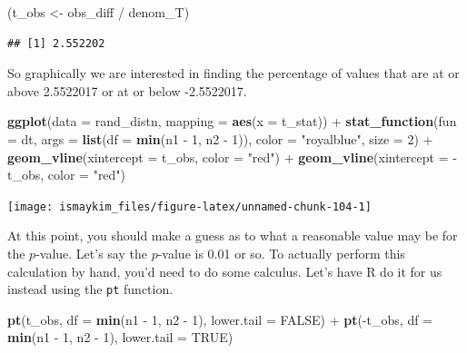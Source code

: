 \documentclass[]{tufte-book}
\newenvironment{Shaded}{\begin{snugshade}}{\end{snugshade}}
\newcommand{\KeywordTok}[1]{\textcolor[rgb]{0.13,0.29,0.53}{\textbf{{#1}}}}
\newcommand{\DataTypeTok}[1]{\textcolor[rgb]{0.13,0.29,0.53}{{#1}}}
\newcommand{\DecValTok}[1]{\textcolor[rgb]{0.00,0.00,0.81}{{#1}}}
\newcommand{\StringTok}[1]{\textcolor[rgb]{0.31,0.60,0.02}{{#1}}}
\newcommand{\OtherTok}[1]{\textcolor[rgb]{0.56,0.35,0.01}{{#1}}}
\newcommand{\NormalTok}[1]{{#1}}
\begin{document}
\begin{Shaded}
\begin{Highlighting}[]
\NormalTok{(t_obs <-}\StringTok{ }\NormalTok{obs_diff /}\StringTok{ }\NormalTok{denom_T)}
\end{Highlighting}
\end{Shaded}

\begin{verbatim}
## [1] 2.552202
\end{verbatim}

So graphically we are interested in finding the percentage of values
that are at or above 2.5522017 or at or below -2.5522017.

\begin{Shaded}
\begin{Highlighting}[]
\KeywordTok{ggplot}\NormalTok{(}\DataTypeTok{data =} \NormalTok{rand_distn, }\DataTypeTok{mapping =} \KeywordTok{aes}\NormalTok{(}\DataTypeTok{x =} \NormalTok{t_stat)) +}
\StringTok{  }\KeywordTok{stat_function}\NormalTok{(}\DataTypeTok{fun =} \NormalTok{dt,}
    \DataTypeTok{args =} \KeywordTok{list}\NormalTok{(}\DataTypeTok{df =} \KeywordTok{min}\NormalTok{(n1 -}\StringTok{ }\DecValTok{1}\NormalTok{, n2 -}\StringTok{ }\DecValTok{1}\NormalTok{)), }
    \DataTypeTok{color =} \StringTok{"royalblue"}\NormalTok{, }\DataTypeTok{size =} \DecValTok{2}\NormalTok{) +}
\StringTok{  }\KeywordTok{geom_vline}\NormalTok{(}\DataTypeTok{xintercept =} \NormalTok{t_obs, }\DataTypeTok{color =} \StringTok{"red"}\NormalTok{) +}
\StringTok{  }\KeywordTok{geom_vline}\NormalTok{(}\DataTypeTok{xintercept =} \NormalTok{-t_obs, }\DataTypeTok{color =} \StringTok{"red"}\NormalTok{)}
\end{Highlighting}
\end{Shaded}

\begin{center}\texttt{[image: ismaykim\_files/figure-latex/unnamed-chunk-104-1]} \end{center}

At this point, you should make a guess as to what a reasonable value may
be for the \(p\)-value. Let's say the \(p\)-value is 0.01 or so. To
actually perform this calculation by hand, you'd need to do some
calculus. Let's have R do it for us instead using the \texttt{pt}
function.

\begin{Shaded}
\begin{Highlighting}[]
\KeywordTok{pt}\NormalTok{(t_obs, }\DataTypeTok{df =} \KeywordTok{min}\NormalTok{(n1 -}\StringTok{ }\DecValTok{1}\NormalTok{, n2 -}\StringTok{ }\DecValTok{1}\NormalTok{), }\DataTypeTok{lower.tail =} \OtherTok{FALSE}\NormalTok{) +}
\StringTok{  }\KeywordTok{pt}\NormalTok{(-t_obs, }\DataTypeTok{df =} \KeywordTok{min}\NormalTok{(n1 -}\StringTok{ }\DecValTok{1}\NormalTok{, n2 -}\StringTok{ }\DecValTok{1}\NormalTok{), }\DataTypeTok{lower.tail =} \OtherTok{TRUE}\NormalTok{)}
\end{Highlighting}
\end{Shaded}
\end{document}
